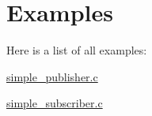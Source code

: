 \section{Examples}
Here is a list of all examples\+:\begin{DoxyCompactItemize}
\item 
\hyperlink{simple_publisher_8c-example}{simple\+\_\+publisher.\+c}
\item 
\hyperlink{simple_subscriber_8c-example}{simple\+\_\+subscriber.\+c}
\end{DoxyCompactItemize}
